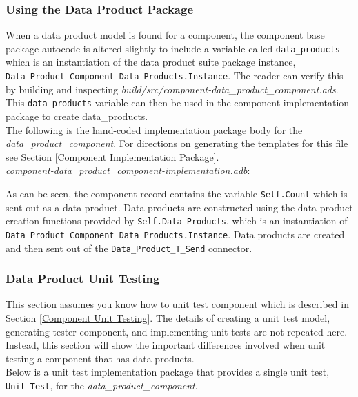 \subsubsection{Using the Data Product Package}

When a data product model is found for a component, the component base package autocode is altered slightly to include a variable called \texttt{data\_products} which is an instantiation of the data product suite package instance, \texttt{Data\_Product\_Component\_Data\_Products.Instance}. The reader can verify this by building and inspecting \textit{build/src/component-data\_product\_component.ads}. This \texttt{data\_products} variable can then be used in the component implementation package to create data\_products. \\

The following is the hand-coded implementation package body for the \textit{data\_product\_component}. For directions on generating the templates for this file see Section \ref{Component Implementation Package}. \\

\textit{component-data\_product\_component-implementation.adb}:

As can be seen, the component record contains the variable \texttt{Self.Count} which is sent out as a data product. Data products are constructed using the data product creation functions provided by \texttt{Self.Data\_Products}, which is an instantiation of \texttt{Data\_Product\_Component\_Data\_Products.Instance}. Data products are created and then sent out of the \texttt{Data\_Product\_T\_Send} connector.

\subsubsection{Data Product Unit Testing}

This section assumes you know how to unit test component which is described in Section \ref{Component Unit Testing}. The details of creating a unit test model, generating tester component, and implementing unit tests are not repeated here. Instead, this section will show the important differences involved when unit testing a component that has data products. \\

Below is a unit test implementation package that provides a single unit test, \texttt{Unit\_Test}, for the \textit{data\_product\_component}. \\


